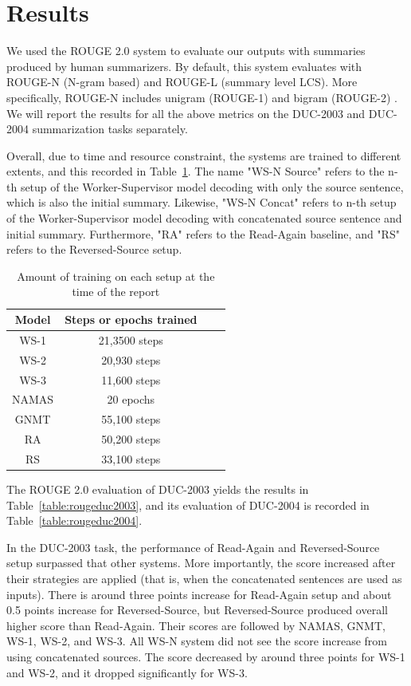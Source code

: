 \documentclass[letterpaper]{article} %
\begin{document}
\section{Results}
We used the ROUGE 2.0 system \cite{ganesan2015rouge} to evaluate our outputs with summaries produced by human summarizers. By default, this system evaluates with ROUGE-N (N-gram based) and ROUGE-L (summary level LCS). More specifically, ROUGE-N includes unigram (ROUGE-1) and bigram (ROUGE-2) . We will report the results for all the above metrics on the DUC-2003 and DUC-2004 summarization tasks separately.

Overall, due to time and resource constraint, the systems are trained to different extents, and this recorded in Table~\ref{table:trainingsteps}. The name "WS-N Source" refers to the n-th setup of the Worker-Supervisor model decoding with only the source sentence, which is also the initial summary. Likewise, "WS-N Concat" refers to n-th setup of the Worker-Supervisor model decoding with concatenated source sentence and initial summary. Furthermore, "RA" refers to the Read-Again baseline, and "RS" refers to the Reversed-Source setup.

\begin{table}[h]
	\centering
	\begin{tabular}{c c c c}
		Model & Steps or epochs trained \\
		\hline
		WS-1 & 21,3500 steps \\
		WS-2 & 20,930 steps \\
		WS-3 & 11,600 steps \\
		\hline
		NAMAS & 20 epochs \\
		GNMT & 55,100 steps \\
		RA & 50,200 steps \\
		RS &  33,100 steps \\
	\end{tabular}
	\caption{Amount of training on each setup at the time of the report}
	\label{table:trainingsteps}
\end{table}

The ROUGE 2.0 evaluation of DUC-2003 yields the results in Table~\ref{table:rougeduc2003}, and its evaluation of DUC-2004 is recorded in Table~\ref{table:rougeduc2004}.

In the DUC-2003 task, the performance of Read-Again and Reversed-Source setup surpassed that other systems. More importantly, the score increased after their strategies are applied (that is, when the concatenated sentences are used as inputs). There is around three points increase for Read-Again setup and about 0.5 points increase for Reversed-Source, but Reversed-Source produced overall higher score than Read-Again. Their scores are followed by NAMAS, GNMT, WS-1, WS-2, and WS-3. All WS-N system did not see the score increase from using concatenated sources. The score decreased by around three points for WS-1 and WS-2, and it dropped significantly for WS-3.
\end{document}
